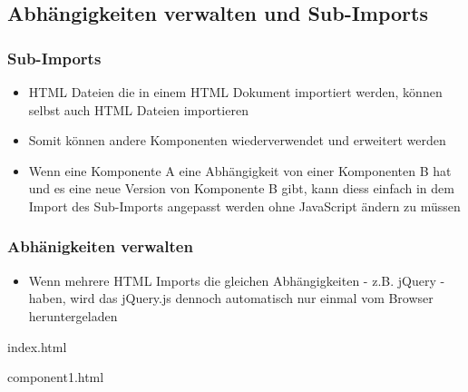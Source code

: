 \subsection{Abhängigkeiten verwalten und
Sub-Imports}\label{abhuxe4ngigkeiten-verwalten-und-sub-imports}

\subsubsection{Sub-Imports}\label{sub-imports}

\begin{itemize}
\tightlist
\item
  HTML Dateien die in einem HTML Dokument importiert werden, können
  selbst auch HTML Dateien importieren
\item
  Somit können andere Komponenten wiederverwendet und erweitert werden
\item
  Wenn eine Komponente A eine Abhängigkeit von einer Komponenten B hat
  und es eine neue Version von Komponente B gibt, kann diess einfach in
  dem Import des Sub-Imports angepasst werden ohne JavaScript ändern zu
  müssen
\end{itemize}

\subsubsection{Abhänigkeiten
verwalten}\label{abhuxe4nigkeiten-verwalten}

\begin{itemize}
\tightlist
\item
  Wenn mehrere HTML Imports die gleichen Abhängigkeiten - z.B. jQuery -
  haben, wird das jQuery.js dennoch automatisch nur einmal vom Browser
  heruntergeladen
\end{itemize}

index.html

\begin{Shaded}
\begin{Highlighting}[]
\KeywordTok{>}
\KeywordTok{>}
\end{Highlighting}
\end{Shaded}

component1.html

\begin{Shaded}
\begin{Highlighting}[]
\end{Highlighting}
\end{Shaded}

